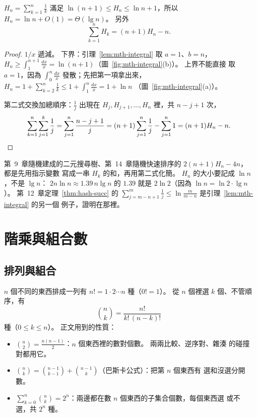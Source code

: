 \begin{theorem}[調和數]
\label{thm:mth-harmonic}
$H_n = \sum_{k=1}^{n} \frac{1}{k}$ 滿足 $\ln(n+1) \le H_n \le \ln n + 1$，所以
$H_n = \ln n + O(1) = \Theta(\lg n)$。 另外
\[
\sum_{k=1}^{n} H_k = (n+1) H_n - n .
\]
\end{theorem}

\begin{proof}
$1/x$ 遞減。 下界：引理~\ref{lem:mth-integral} 取 $a = 1$、$b = n$，
$H_n \ge \int_1^{n+1} \frac{dx}{x} = \ln(n+1)$（圖~\ref{fig:mth-integral}(b)）。 上界不能直接
取 $a = 1$，因為 $\int_0^n \frac{dx}{x}$ 發散；先把第一項拿出來，
$H_n = 1 + \sum_{k=2}^{n} \frac1k \le 1 + \int_1^n \frac{dx}{x} = 1 + \ln n$
（圖~\ref{fig:mth-integral}(a)）。

第二式交換加總順序：$\frac{1}{j}$ 出現在 $H_j, H_{j+1}, \ldots, H_n$ 裡，共 $n - j + 1$ 次，
\[
\sum_{k=1}^{n} \sum_{j=1}^{k} \frac{1}{j} = \sum_{j=1}^{n} \frac{n - j + 1}{j}
= (n+1) \sum_{j=1}^{n} \frac{1}{j} - \sum_{j=1}^{n} 1 = (n+1)H_n - n. \qedhere
\]
\end{proof}

第~9~章隨機建成的二元搜尋樹、第~14~章隨機快速排序的 $2(n+1)H_n - 4n$，都是先用指示變數
寫成一串 $H_k$ 的和，再用第二式化簡。 $H_n$ 的大小要記成 $\ln n$，不是 $\lg n$：
$2n \ln n \approx 1.39\, n \lg n$ 的 $1.39$ 就是 $2 \ln 2$（因為 $\ln n = \ln 2 \cdot \lg n$）。 第~12~章定理~\ref{thm:hash-succ} 的
$\sum_{j=m-n+1}^{m} \frac1j \le \ln \frac{m}{m-n}$ 是引理~\ref{lem:mth-integral} 的另一個
例子，證明在那裡。

\section{階乘與組合數}
\label{sec:mth-binom}

\subsection{排列與組合}

$n$ 個不同的東西排成一列有 $n! = 1 \cdot 2 \cdots n$ 種（$0! = 1$）。 從 $n$ 個裡選 $k$
個、不管順序，有
\[
\binom{n}{k} = \frac{n!}{k!\,(n-k)!}
\]
種（$0 \le k \le n$）。 正文用到的性質：

\begin{itemize}
\item $\binom{n}{2} = \frac{n(n-1)}{2}$：$n$ 個東西裡的數對個數。 兩兩比較、逆序對、雜湊
的碰撞對都用它。 
\item $\binom{n}{k} = \binom{n-1}{k-1} + \binom{n-1}{k}$（巴斯卡公式）：把第 $n$ 個東西有
選和沒選分開數。 
\item $\sum_{k=0}^{n} \binom{n}{k} = 2^n$：兩邊都在數 $n$ 個東西的子集合個數，每個東西選
或不選，共 $2^n$ 種。 
\end{itemize}

